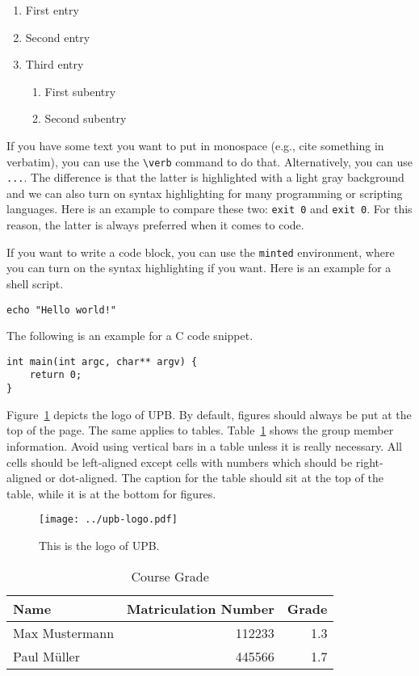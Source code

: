 \begin{enumerate}
    \item First entry
    \item Second entry
    \item Third entry
        \begin{enumerate}
            \item First subentry
            \item Second subentry
        \end{enumerate}
\end{enumerate}

If you have some text you want to put in monospace (e.g., cite something in verbatim), you can use the \verb+\verb+ command to do that. Alternatively, you can use \texttt{\texttt{...}}. The difference is that the latter is highlighted with a light gray background and we can also turn on syntax highlighting for many programming or scripting languages. Here is an example to compare these two: \verb+exit 0+ and \texttt{exit 0}. For this reason, the latter is always preferred when it comes to code. 

If you want to write a code block, you can use the \texttt{minted} environment, where you can turn on the syntax highlighting if you want. Here is an example for a shell script.

\begin{verbatim}
echo "Hello world!"
\end{verbatim}

The following is an example for a C code snippet.

\begin{verbatim}
int main(int argc, char** argv) {
    return 0;
}
\end{verbatim}

Figure~\ref{fig:upb-logo} depicts the logo of UPB. By default, figures should always be put at the top of the page. The same applies to tables. Table~\ref{tab:info} shows the group member information. Avoid using vertical bars in a table unless it is really necessary. All cells should be left-aligned except cells with numbers which should be right-aligned or dot-aligned. The caption for the table should sit at the top of the table, while it is at the bottom for figures.

\begin{figure}[!t]
    \centering
    \texttt{[image: ../upb-logo.pdf]}
    \caption{This is the logo of UPB.}
    \label{fig:upb-logo}
\end{figure}

\begin{table}
    \centering
    \caption{Course Grade}\label{tab:info}
    \begin{tabular}{lrr}
        \toprule
        \textbf{Name} & \textbf{Matriculation Number} & \textbf{Grade} \\
        \midrule
        Max Mustermann & 112233 & 1.3 \\
        Paul M\"uller & 445566 & 1.7 \\
        \bottomrule
    \end{tabular}
\end{table}